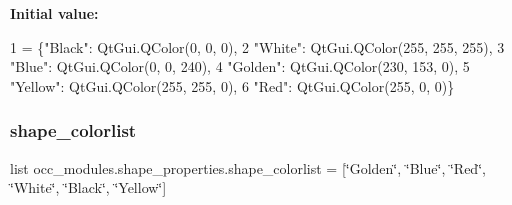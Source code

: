 {\bfseries Initial value\+:}
\begin{DoxyCode}
1 =  \{\textcolor{stringliteral}{"Black"}: QtGui.QColor(0, 0, 0),
2                             \textcolor{stringliteral}{"White"}: QtGui.QColor(255, 255, 255),
3                             \textcolor{stringliteral}{"Blue"}: QtGui.QColor(0, 0, 240),
4                             \textcolor{stringliteral}{"Golden"}: QtGui.QColor(230, 153, 0),
5                             \textcolor{stringliteral}{"Yellow"}: QtGui.QColor(255, 255, 0),
6                             \textcolor{stringliteral}{"Red"}: QtGui.QColor(255, 0, 0)\}
\end{DoxyCode}
\hypertarget{a00056_ad2dbba5d4e06c2ef16d74722e24325bb}{}\label{a00056_ad2dbba5d4e06c2ef16d74722e24325bb} 
\subsubsection{\texorpdfstring{shape\+\_\+colorlist}{shape\_colorlist}}
{\footnotesize\ttfamily list occ\+\_\+modules.\+shape\+\_\+properties.\+shape\+\_\+colorlist = \mbox{[}\char`\"{}Golden\char`\"{}, \char`\"{}Blue\char`\"{}, \char`\"{}Red\char`\"{}, \char`\"{}White\char`\"{}, \char`\"{}Black\char`\"{}, \char`\"{}Yellow\char`\"{}\mbox{]}}

